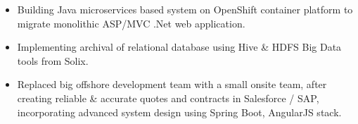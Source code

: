 \documentclass[10pt,a4paper,ragged2e]{altacv}
\begin{document}

\begin{fullwidth}
\makecvheader
\end{fullwidth}



\begin{itemize}
\item Building Java microservices based system on OpenShift container platform to migrate monolithic ASP/MVC .Net web application.
\item Implementing archival of relational database using Hive \& HDFS Big Data tools from Solix.
\end{itemize}

\divider

\begin{itemize}
\item Replaced big offshore development team with a small onsite team,  after creating reliable \& accurate quotes and contracts in Salesforce / SAP, incorporating advanced system design using Spring Boot, AngularJS stack.
\end{itemize}
\end{document}
